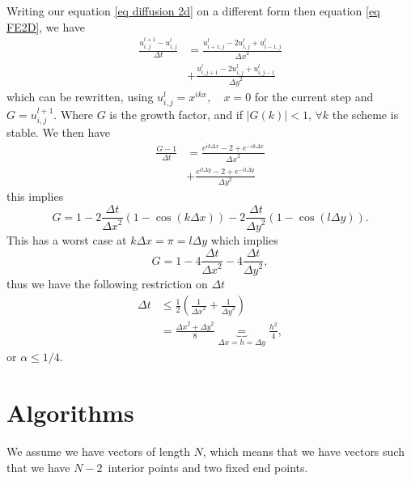 \documentclass[%
reprint,
nofootinbib,
amsmath,amssymb,
aps,
]{revtex4-1}
\newcommand{\dt}{{\Delta t}}
\newcommand{\dx}{{\Delta x}}
\newcommand{\dy}{{\Delta y}}
\begin{document}
Writing our equation \eqref{eq diffusion 2d} on a different form then equation \eqref{eq FE2D}, we have
\begin{equation}
	\begin{split}
		\frac{u_{i,j}^{l+1} - u_{i,j}^{l}}{\dt} &= \frac{u_{i+1,j}^{l} - 2u_{i,j}^{l}+u_{i-1,j}^{l}}{\dx^2} \\
		&+ \frac{u_{i,j+1}^{l} - 2u_{i,j}^{l}+u_{i,j-1}^{l}}{\dy^2}
	\end{split}
\end{equation}
which can be rewritten, using $u_{i,j}^{l} = x^{ikx}, \quad x = 0$ for the current step and $G = u_{i,j}^{l+1}$. Where $G$ is the growth factor, and if $|G(k)|<1,\,\forall k$ the scheme is stable. We then have 
\begin{equation}
	\begin{split}
		\frac{G - 1}{\dt} &= \frac{e^{ik\dx} - 	2+e^{-ik\dx}}{\dx^2} \\
		&+ \frac{e^{il\dy} - 2+e^{-il\dy}}{\dy^2}
	\end{split}
\end{equation}
this implies 
\begin{equation}
	G = 1-2\frac{\dt}{\dx^2}\left(1-\cos\left(k\dx\right)\right) - 2\frac{\dt}{\dy^2}\left(1-\cos\left(l\dy\right)\right).
\end{equation}
This has a worst case at $k\dx = \pi = l\dy$ which implies
\begin{equation}
	G = 1-4\frac{\dt}{\dx^2}-4\frac{\dt}{\dy^2},
\end{equation}
thus we have the following restriction on $\dt$
\begin{equation}
	\begin{split}
			\dt &\leq \frac{1}{2}\left(\frac{1}{\dx^2} + \frac{1}{\dy^2}\right)\\
			&= \frac{\dx^2 + \dy^2}{8} \underbrace{=}_{\dx = h = \dy} \frac{h^2}{4},
	\end{split}
\end{equation}
or $\alpha \leq 1/4$.
\section{Algorithms} %
We assume we have vectors of length $N$, which means that we have vectors such that we have $N-2$ interior points and two fixed end points. 
\end{document}
